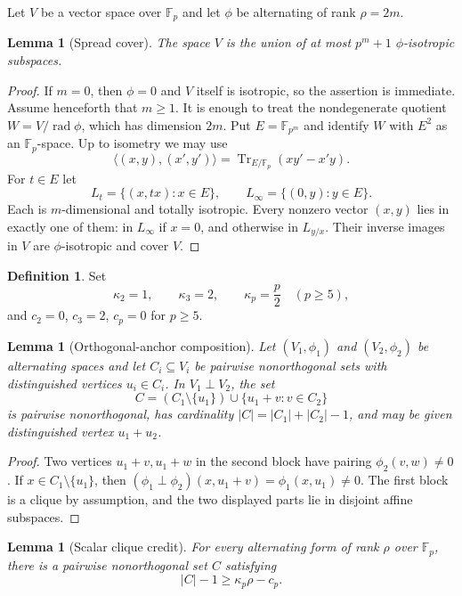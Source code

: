 \documentclass[11pt]{article}
\newtheorem{lemma}[theorem]{Lemma}
\theoremstyle{definition}
\newtheorem{definition}[theorem]{Definition}
\theoremstyle{remark}
\newcommand{\F}{\mathbb{F}}
\newcommand{\rad}{\operatorname{rad}}
\newcommand{\Tr}{\operatorname{Tr}}
\begin{document}
Let $V$ be a vector space over $\F_p$ and let $\phi$ be alternating of rank $\rho=2m$.

\begin{lemma}[Spread cover]\label{lem:spread}
The space $V$ is the union of at most $p^m+1$ $\phi$-isotropic subspaces.
\end{lemma}

\begin{proof}
If $m=0$, then $\phi=0$ and $V$ itself is isotropic, so the assertion is immediate. Assume henceforth that $m\ge1$. It is enough to treat the nondegenerate quotient $W=V/\rad\phi$, which has dimension $2m$. Put $E=\F_{p^m}$ and identify $W$ with $E^2$ as an $\F_p$-space. Up to isometry we may use
\[
\langle(x,y),(x',y')\rangle=\Tr_{E/\F_p}(xy'-x'y).
\]
For $t\in E$ let
\[
L_t=\{(x,tx):x\in E\},\qquad L_\infty=\{(0,y):y\in E\}.
\]
Each is $m$-dimensional and totally isotropic. Every nonzero vector $(x,y)$ lies in exactly one of them: in $L_\infty$ if $x=0$, and otherwise in $L_{y/x}$. Their inverse images in $V$ are $\phi$-isotropic and cover $V$.
\end{proof}

\begin{definition}\label{def:kappa}
Set
\[
\kappa_2=1,\qquad \kappa_3=2,\qquad \kappa_p=\frac p2\quad(p\ge5),
\]
and $c_2=0$, $c_3=2$, $c_p=0$ for $p\ge5$.
\end{definition}

\begin{lemma}[Orthogonal-anchor composition]\label{lem:anchor}
Let $(V_1,\phi_1)$ and $(V_2,\phi_2)$ be alternating spaces and let $C_i\subseteq V_i$ be pairwise nonorthogonal sets with distinguished vertices $u_i\in C_i$. In $V_1\perp V_2$, the set
\[
C=(C_1\setminus\{u_1\})\cup\{u_1+v:v\in C_2\}
\]
is pairwise nonorthogonal, has cardinality $|C|=|C_1|+|C_2|-1$, and may be given distinguished vertex $u_1+u_2$.
\end{lemma}

\begin{proof}
Two vertices $u_1+v,u_1+w$ in the second block have pairing $\phi_2(v,w)\ne0$. If $x\in C_1\setminus\{u_1\}$, then $(\phi_1\perp\phi_2)(x,u_1+v)=\phi_1(x,u_1)\ne0$. The first block is a clique by assumption, and the two displayed parts lie in disjoint affine subspaces.
\end{proof}

\begin{lemma}[Scalar clique credit]\label{lem:scalar-credit}
For every alternating form of rank $\rho$ over $\F_p$, there is a pairwise nonorthogonal set $C$ satisfying
\[
|C|-1\ge \kappa_p\rho-c_p.
\]
\end{lemma}
\end{document}
